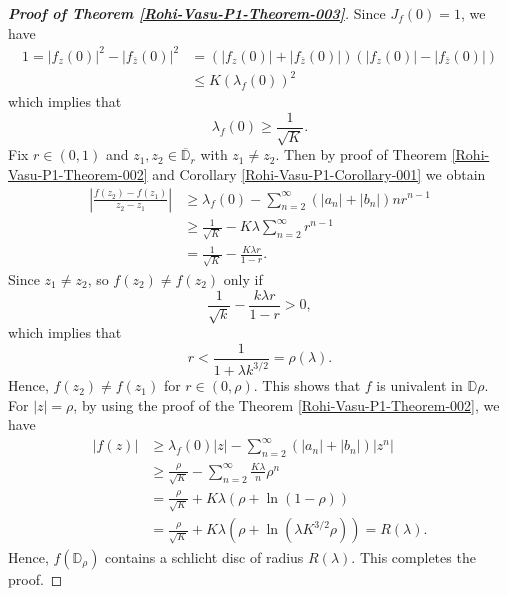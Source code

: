 \documentclass[a4paper,12pt]{amsart}
\theoremstyle{plain}
\theoremstyle{definition}
\begin{document}
\begin{proof}[{\bf Proof of Theorem   \ref{Rohi-Vasu-P1-Theorem-003}}]
Since $J_f(0)=1$, we have 
\begin{align*}
1=|f_z(0)|^2-|f_{\bar{z}}(0)|^2 &=(|f_z(0)|+|f_{\bar{z}}(0)|)(|f_z(0)|-|f_{\bar{z}}(0)|)\\
&\leq K\left(\lambda_f(0)\right)^2
\end{align*}
which implies that
$$
 \lambda_f(0) \geq \frac{1}{\sqrt{K}}.
$$
Fix $r\in (0,1)$ and $z_1, z_2 \in \mathbb{\overline{D}}_r$ with $z_1 \neq z_2$. Then by proof of Theorem \ref{Rohi-Vasu-P1-Theorem-002} and Corollary \ref{Rohi-Vasu-P1-Corollary-001} we obtain
\begin{align*}
\left|\frac{f(z_2)-f(z_1)}{z_2-z_1}\right| &\geq \lambda_f(0)-\sum_{n=2}^{\infty}\left(|a_n|+|b_n|\right) n r^{n-1} \\
& \geq \frac{1}{\sqrt{K}}-K \lambda \sum_{n=2}^{\infty} r^{n-1}\\
& = \frac{1}{\sqrt{K}}-\frac{K \lambda r}{1-r}.
\end{align*}
Since $z_1 \neq z_2$, so $f\left(z_2\right) \neq f\left(z_2\right)$ only if
$$
\frac{1}{\sqrt{k}}-\frac{k \lambda r}{1-r} >0, $$ 
which implies that
$$ r<\frac{1}{1+\lambda k^{3 / 2}}=\rho(\lambda).
$$
Hence, $f\left(z_2\right) \neq f\left(z_1\right)$ for $r \in(0, \rho)$. This shows that $f$ is univalent in $\mathbb{D}\rho$.\\
For $|z|=\rho$, by using the proof of the Theorem \ref{Rohi-Vasu-P1-Theorem-002}, we have
\begin{align*}
|f(z)| &\geq \lambda_f(0)|z|-\sum_{n=2}^{\infty}\left(|a_n|+|b_n|\right)|z^n| \\
 & \geq \frac{\rho}{\sqrt{K}}-\sum_{n=2}^{\infty} \frac{K \lambda}{n} \rho^n \\
 & =\frac{\rho}{\sqrt{K}}+K \lambda(\rho+\ln (1-\rho))\\
 & =\frac{\rho}{\sqrt{K}}+K \lambda\left(\rho + \ln(\lambda K^{3/2} \rho)\right)=R(\lambda).
\end{align*}
Hence, $f(\mathbb{D}_\rho)$ contains a schlicht disc of radius $R(\lambda ).$ This completes the proof.
 \end{proof}
\end{document}

